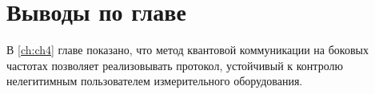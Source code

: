 \pagebreak

\section{Выводы по главе} \label{ch:ch4/sec7}


В \ref{ch:ch4} главе показано, что метод квантовой коммуникации на боковых частотах позволяет реализовывать протокол, устойчивый к контролю нелегитимным пользователем измерительного оборудования. 
 
\pagebreak

